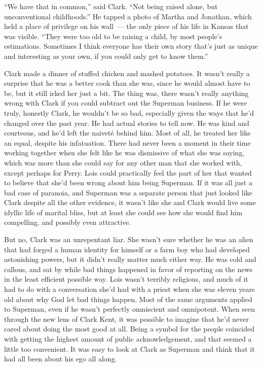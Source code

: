 \documentclass[ebook,12pt]{memoir}
\begin{document}
``We have that in common,'' said Clark. ``Not being raised alone, but
unconventional childhoods.'' He tapped a photo of Martha and Jonathan,
which held a place of privilege on his wall~--- the only piece of his
life in Kansas that was visible. ``They were too old to be raising a
child, by most people's estimations. Sometimes I think everyone has
their own story that's just as unique and interesting as your own, if
you could only get to know them.''

Clark made a dinner of stuffed chicken and mashed potatoes. It wasn't
really a surprise that he was a better cook than she was, since he would
almost have to be, but it still irked her just a bit. The thing was,
there wasn't really anything wrong with Clark if you could subtract out
the Superman business. If he were truly, honestly Clark, he wouldn't be
so bad, especially given the ways that he'd changed over the past year.
He had actual stories to tell now. He was kind and courteous, and he'd
left the naiveté behind him. Most of all, he treated her like an equal,
despite his infatuation. There had never been a moment in their time
working together when she felt like he was dismissive of what she was
saying, which was more than she could say for any other man that she
worked with, except perhaps for Perry. Lois could practically feel the
part of her that wanted to believe that she'd been wrong about him being
Superman. If it was all just a bad case of paranoia, and Superman was a
separate person that just looked like Clark despite all the other
evidence, it wasn't like she and Clark would live some idyllic life of
marital bliss, but at least she could see how she would find him
compelling, and possibly even attractive.

But no, Clark was an unrepentant liar. She wasn't sure whether he was an
alien that had forged a human identity for himself or a farm boy who had
developed astonishing powers, but it didn't really matter much either
way. He was cold and callous, and sat by while bad things happened in
favor of reporting on the news in the least efficient possible way. Lois
wasn't terribly religious, and much of it had to do with a conversation
she'd had with a priest when she was eleven years old about why God let
bad things happen. Most of the same arguments applied to Superman, even
if he wasn't perfectly omniscient and omnipotent. When seen through the
new lens of Clark Kent, it was possible to imagine that he'd never cared
about doing the most good at all. Being a symbol for the people
coincided with getting the highest amount of public acknowledgement, and
that seemed a little too convenient. It was easy to look at Clark as
Superman and think that it had all been about his ego all along.
\end{document}
